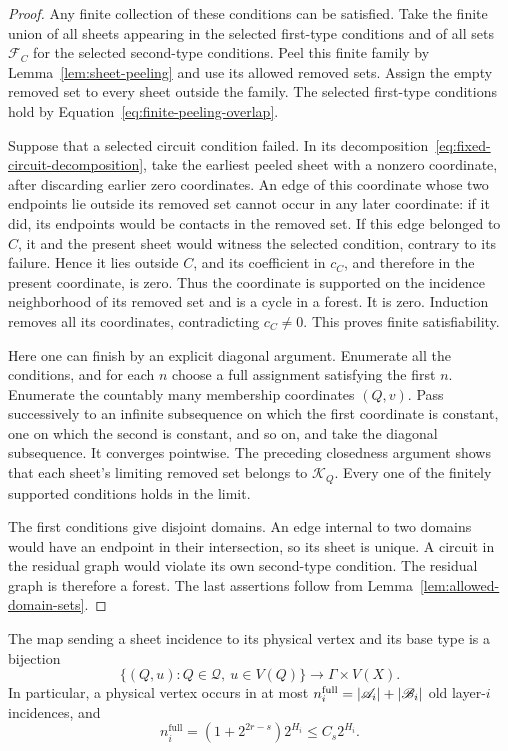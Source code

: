 \begin{proof}
Any finite collection of these conditions can be satisfied.  Take
the finite union of all sheets appearing in the selected first-type
conditions and of all sets $\mathcal F_C$ for the selected second-type
conditions.  Peel this finite family by
Lemma~\ref{lem:sheet-peeling} and use its allowed removed sets.  Assign
the empty removed set to every sheet outside the family.  The
selected first-type conditions hold by
Equation~\eqref{eq:finite-peeling-overlap}.

Suppose that a selected circuit condition failed.  In its
decomposition~\eqref{eq:fixed-circuit-decomposition}, take the earliest
peeled sheet with a nonzero coordinate, after discarding earlier zero
coordinates.  An edge of this coordinate whose two endpoints lie
outside its removed set cannot occur in any later coordinate: if it
did, its endpoints would be contacts in the removed set.  If this
edge belonged to $C$, it and the present sheet would witness the
selected condition, contrary to its failure.  Hence it lies outside
$C$, and its coefficient in $c_C$, and therefore in the present
coordinate, is zero.  Thus the coordinate is supported on the incidence
neighborhood of its removed set and is a cycle in a forest.  It is
zero.  Induction removes all its coordinates, contradicting
$c_C\ne0$.  This proves finite satisfiability.

Here one can finish by an explicit diagonal argument.  Enumerate
all the conditions, and for each $n$ choose a full assignment
satisfying the first $n$.  Enumerate the countably many membership
coordinates $(Q,v)$.  Pass successively to an infinite subsequence
on which the first coordinate is constant, one on which the second
is constant, and so on, and take the diagonal subsequence.  It
converges pointwise.  The preceding closedness argument shows that
each sheet's limiting removed set belongs to $\mathcal K_Q$.  Every
one of the finitely supported conditions holds in the limit.

The first conditions give disjoint domains.  An edge internal to
two domains would have an endpoint in their intersection, so its
sheet is unique.  A circuit in the residual graph would violate its
own second-type condition.  The residual graph is therefore a
forest.  The last assertions follow from
Lemma~\ref{lem:allowed-domain-sets}.
\end{proof}

\begin{lemma}
\label{lem:sheet-incidences}
The map sending a sheet incidence to its physical vertex and its
base type is a bijection
\begin{equation}
 \{(Q,u):Q\in\mathcal Q,\ u\in V(Q)\}
       \longrightarrow \Gamma\times V(X).
 \label{eq:sheet-incidence-bijection}
\end{equation}
In particular, a physical vertex occurs in at most
$n_i^{\mathrm{full}}=\left\lvert\mathscr A_i\right\rvert+\left\lvert\mathscr B_i\right\rvert$ old layer-$i$ incidences,
and
\begin{equation}
 n_i^{\mathrm{full}}=(1+2^{2r-s})2^{H_i}\leq C_s2^{H_i}.
 \label{eq:old-layer-incidences}
\end{equation}
\end{lemma}

